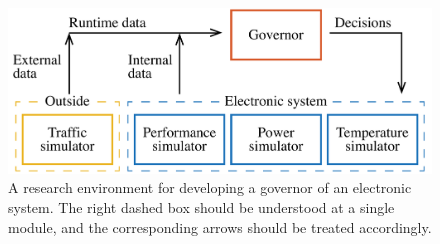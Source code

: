 \begin{figure}[b]
  \centering
  \includegraphics[width=1.0\columnwidth]{include/assets/figures/development.pdf}
  \caption{
    A research environment for developing a governor of an electronic system.
    The right dashed box should be understood at a single module, and the
    corresponding arrows should be treated accordingly.
  }
\end{figure}

